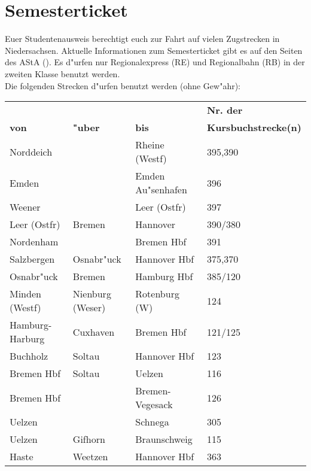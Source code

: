 \onecolumn
\section{Semesterticket}
Euer Studentenausweis berechtigt euch zur Fahrt auf vielen Zugstrecken in
Niedersachsen. Aktuelle Informationen zum Semesterticket gibt es auf den Seiten
des AStA ().
Es d"urfen nur Regionalexpress (RE) und Regionalbahn (RB) in der zweiten Klasse
benutzt werden.\\
Die folgenden Strecken d"urfen benutzt werden (ohne Gew"ahr):
\begin{table}[h]
\centering
\begin{tabular}{l|l|l|l}
	& & & \textbf{Nr. der}\\
	\textbf{von} & \textbf{"uber} & \textbf{bis} & \textbf{Kursbuchstrecke(n)}\\
	\hline
	Norddeich        &                      & Rheine (Westf)     & 395,390\\
	Emden            &                      & Emden Au"senhafen  & 396\\
	Weener           &                      & Leer (Ostfr)       & 397\\
	Leer (Ostfr)     & Bremen               & Hannover           & 390/380\\
	Nordenham        &                      & Bremen Hbf         & 391\\
	Salzbergen       & Osnabr"uck           & Hannover Hbf       & 375,370\\
	Osnabr"uck       & Bremen               & Hamburg Hbf        & 385/120\\
	Minden (Westf)   & Nienburg (Weser)     & Rotenburg (W)      & 124\\
	Hamburg-Harburg  & Cuxhaven             & Bremen Hbf         & 121/125\\
	Buchholz         & Soltau               & Hannover Hbf       & 123\\
	Bremen Hbf       & Soltau               & Uelzen             & 116\\
	Bremen Hbf       &                      & Bremen-Vegesack    & 126\\
	Uelzen           &                      & Schnega            & 305\\
	Uelzen           & Gifhorn              & Braunschweig       & 115\\
	Haste            & Weetzen              & Hannover Hbf       & 363\\

\end{tabular}
\end{table}
